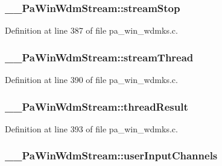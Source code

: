 \subsubsection[{\texorpdfstring{stream\+Stop}{streamStop}}]{ \+\_\+\+\_\+\+Pa\+Win\+Wdm\+Stream\+::stream\+Stop}\hypertarget{struct_____pa_win_wdm_stream_a970f778b68693673b00fedf8ff4f201d}{}\label{struct_____pa_win_wdm_stream_a970f778b68693673b00fedf8ff4f201d}


Definition at line 387 of file pa\+\_\+win\+\_\+wdmks.\+c.

\subsubsection[{\texorpdfstring{stream\+Thread}{streamThread}}]{ \+\_\+\+\_\+\+Pa\+Win\+Wdm\+Stream\+::stream\+Thread}\hypertarget{struct_____pa_win_wdm_stream_a696e6c139cc0dfad91ab108dbf446a12}{}\label{struct_____pa_win_wdm_stream_a696e6c139cc0dfad91ab108dbf446a12}


Definition at line 390 of file pa\+\_\+win\+\_\+wdmks.\+c.

\subsubsection[{\texorpdfstring{thread\+Result}{threadResult}}]{ \+\_\+\+\_\+\+Pa\+Win\+Wdm\+Stream\+::thread\+Result}\hypertarget{struct_____pa_win_wdm_stream_a3fde31efa009b90dc634e4cb24507976}{}\label{struct_____pa_win_wdm_stream_a3fde31efa009b90dc634e4cb24507976}


Definition at line 393 of file pa\+\_\+win\+\_\+wdmks.\+c.

\subsubsection[{\texorpdfstring{user\+Input\+Channels}{userInputChannels}}]{ \+\_\+\+\_\+\+Pa\+Win\+Wdm\+Stream\+::user\+Input\+Channels}\hypertarget{struct_____pa_win_wdm_stream_ac89b1708e9a4877523c85ed6961d4fe7}{}\label{struct_____pa_win_wdm_stream_ac89b1708e9a4877523c85ed6961d4fe7}


